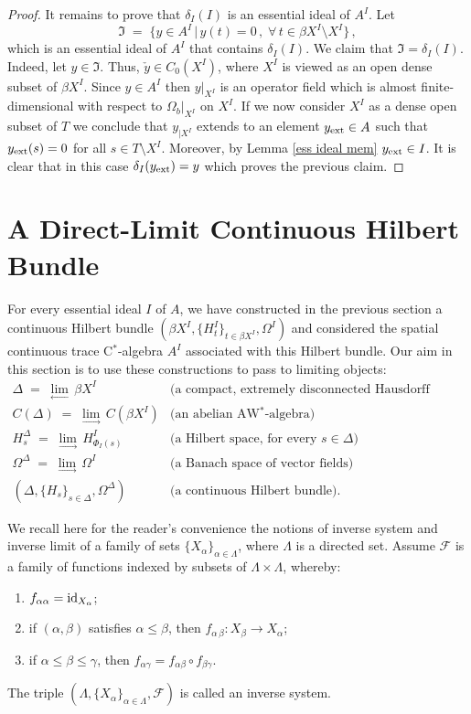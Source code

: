 \documentclass{amsart}
\theoremstyle{definition}
\theoremstyle{remark}
\begin{document}
\begin{proof}
It remains to prove that $\delta_I(I)$ is an essential ideal of $A^I$.
Let
\[
\mathfrak I\;=\;\{y\in A^I\,|\,y(t)=0\,,\;\forall\,t\in\beta X^I\setminus X^I\}\,,
\]
which is an essential ideal of $A^I$ that contains $\delta_I(I)$. We claim that $\mathfrak I=\delta_I(I)$. Indeed, let $y\in\mathfrak I$.
Thus, $\check y\in C_0(X^I)$, where $X^I$ is viewed as an open dense subset of $\beta X^I$. Since $y\in A^I$ then $y|_{X^I}$ is an
operator field which is almost finite-dimensional with respect to $\Omega_b|_{X^I}$ on $X^I$. If we now consider $X^I$ as a
dense open subset of $T$ we conclude that
 $y_{|X^I}$ extends to an element $y_{\rm ext}\in A$ such that $y_{\rm ext}(s)=0$ for all $s\in T\setminus X^I$. Moreover, by
 Lemma \ref{ess ideal mem} $y_{\rm ext}\in I$. It is clear that in this case $\delta_I(y_{\rm ext})=y$ which proves the previous claim.
\end{proof}

\section{A Direct-Limit Continuous Hilbert Bundle}\label{S:hb}

For every essential ideal $I$ of $A$, we have constructed in the previous section a continuous Hilbert bundle
$(\beta X^I, \{H_t^I\}_{t\in \beta X^I},\Omega^{I})$ and considered
the
spatial continuous trace C$^*$-algebra $A^I$ associated with this Hilbert bundle. Our aim in this section is to use
these constructions to pass to limiting objects:
\[
\begin{array}{ll}
\Delta\;=\;\displaystyle\lim_{\leftarrow}\,\beta X^I                     & \mbox{(a compact, extremely disconnected Hausdorff space)} \\
C(\Delta) \;=\; \displaystyle\lim_\rightarrow\,C(\beta X^I)         & \mbox{(an abelian AW$^*$-algebra)} \\
H_s^\Delta\;=\;\displaystyle\lim_{\rightarrow}\,H_{\Phi_I(s)}^I & \mbox{(a Hilbert space, for every $s\in\Delta$)} \\
\Omega^\Delta\;=\;\displaystyle\lim_{\rightarrow}\,\Omega^I   & \mbox{(a Banach space of vector fields)} \\
(\Delta, \{H_s\}_{s\in\Delta}, \Omega^\Delta)                           & \mbox{(a continuous Hilbert bundle).}
\end{array}
\]

We recall here for the reader's convenience the notions of inverse system and inverse limit of a family of sets $\{X_\alpha\}_{\alpha\in\Lambda}$,
where $\Lambda$ is a directed set. Assume $\mathcal F$ is a family of functions indexed by
subsets of $\Lambda\times\Lambda$, whereby:
\begin{enumerate}
\item $f_{\alpha\alpha}={\rm id}_{X_\alpha}$;
\item if $(\alpha,\beta)$ satisfies $\alpha\le\beta$, then $f_{\alpha\,\beta}:X_\beta\rightarrow X_\alpha$;
\item if $\alpha\leq\beta\leq\gamma$, then $f_{\alpha\gamma}=f_{\alpha\beta}\circ f_{\beta\gamma}$.
\end{enumerate}
The triple $(\Lambda, \{X_\alpha\}_{\alpha\in\Lambda}, \mathcal F)$ is called an inverse system.
\end{document}

